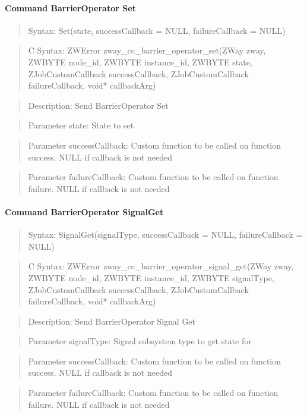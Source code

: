 \paragraph{Command BarrierOperator Set}
\begin{quote}Syntax: Set(state, successCallback = NULL, failureCallback = NULL)\end{quote}
\begin{quote}C Syntax: ZWError zway\_cc\_barrier\_operator\_set(ZWay zway, ZWBYTE node\_id, ZWBYTE instance\_id, ZWBYTE state, ZJobCustomCallback successCallback, ZJobCustomCallback failureCallback, void* callbackArg)\end{quote}
\begin{quote}Description: Send BarrierOperator Set\end{quote}
\begin{quote}Parameter state: State to set\end{quote}
\begin{quote}Parameter successCallback: Custom function to be called on function success. NULL if callback is not needed\end{quote}
\begin{quote}Parameter failureCallback: Custom function to be called on function failure. NULL if callback is not needed\end{quote}


\paragraph{Command BarrierOperator SignalGet}
\begin{quote}Syntax: SignalGet(signalType, successCallback = NULL, failureCallback = NULL)\end{quote}
\begin{quote}C Syntax: ZWError zway\_cc\_barrier\_operator\_signal\_get(ZWay zway, ZWBYTE node\_id, ZWBYTE instance\_id, ZWBYTE signalType, ZJobCustomCallback successCallback, ZJobCustomCallback failureCallback, void* callbackArg)\end{quote}
\begin{quote}Description: Send BarrierOperator Signal Get\end{quote}
\begin{quote}Parameter signalType: Signal subsystem type to get state for\end{quote}
\begin{quote}Parameter successCallback: Custom function to be called on function success. NULL if callback is not needed\end{quote}
\begin{quote}Parameter failureCallback: Custom function to be called on function failure. NULL if callback is not needed\end{quote}


